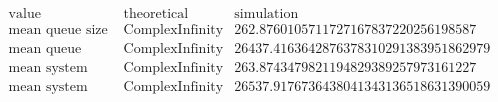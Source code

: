 \[\begin{array}{cccc}
 \text{value} & \text{theoretical} & \text{simulation} & \text{} \\
 \text{mean queue size} & \text{ComplexInfinity} & 262.8760105711727167837220256198587 & \text{} \\
 \text{mean queue time} & \text{ComplexInfinity} & 26437.4163642876378310291383951862979 & \text{} \\
 \text{mean system size} & \text{ComplexInfinity} & 263.8743479821194829389257973161227 & \text{} \\
 \text{mean system time} & \text{ComplexInfinity} & 26537.9176736438041343136518631390059 & \text{} \\
\end{array}\]

